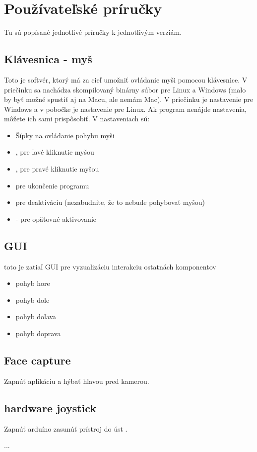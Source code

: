 \chapter{Používateľské príručky}
\tab[5 mm] Tu sú popísané jednotlivé príručky k jednotlivým verziám.
\section{ Klávesnica - myš }
\tab[5 mm] 
Toto je softvér, ktorý má za cieľ umožniť ovládanie myši pomocou klávesnice. V priečinku  sa nachádza skompilovaný binárny súbor pre Linux a Windows (malo by byť možné spustiť aj na Macu, ale nemám Mac). V priečinku  je nastavenie pre Windows a v pobočke  je nastavenie pre Linux. Ak program nenájde nastavenia, môžete ich sami prispôsobiť. V nastaveniach sú: 
\begin{itemize}
\item	Šípky na ovládanie pohybu myši
\item	 {},  pre ľavé kliknutie myšou 
\item	{}, pre pravé kliknutie myšou
\item	{} pre ukončenie programu 
\item	{} pre deaktiváciu (nezabudnite, že to nebude pohybovať myšou)
\item	{} - pre opätovné aktivovanie
\end{itemize}

\section{GUI}
\tab[5 mm] toto je zatiaľ GUI pre vyzualizáciu interakciu ostatnách komponentov
\begin{itemize}
\item	{} pohyb hore
\item	{} pohyb dole
\item	{} pohyb doľava
\item	{} pohyb doprava 
\end{itemize}


\section{Face capture}
\tab[5 mm] Zapnúť aplikáciu a hýbať hlavou pred kamerou.


\section{hardware joystick}
\tab[5 mm] Zapnúť arduíno zasunúť prístroj do úst .

...